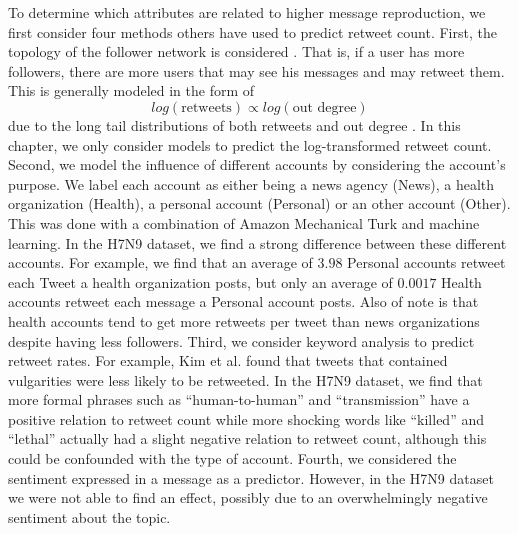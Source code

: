 To determine which attributes are related to higher message reproduction, we first consider four methods others have used to predict retweet count. First, the topology of the follower network is considered \cite{kwak2010twitter,Osborne2011rt}. That is, if a user has more followers, there are more users that may see his messages and may retweet them. This is generally modeled in the form of
\begin{equation}
log(\textrm{retweets}) \propto log(\textrm{out degree})
\end{equation}
due to the long tail distributions of both retweets and out degree \cite{kwak2010twitter}. In this chapter, we only consider models to predict the log-transformed retweet count. Second, we model the influence of different accounts by considering the account's purpose. We label each account as either being a news agency (News), a health organization (Health), a personal account (Personal) or an other account (Other). This was done with a combination of Amazon Mechanical Turk and machine learning. In the H7N9 dataset, we find a strong difference between these different accounts. For example, we find that an average of \(3.98\) Personal accounts retweet each Tweet a health organization posts, but only an average of \(0.0017\) Health accounts retweet each message a Personal account posts. Also of note is that health accounts tend to get more retweets per tweet than news organizations despite having less followers. Third, we consider keyword analysis to predict retweet rates. \cite{gransee2012,Kim2012retweet} For example, Kim et al. \cite{Kim2012retweet} found that tweets that contained vulgarities were less likely to be retweeted. In the H7N9 dataset, we find that more formal phrases such as ``human-to-human'' and ``transmission'' have a positive relation to retweet count while more shocking words like ``killed'' and ``lethal'' actually had a slight negative relation to retweet count, although this could be confounded with the type of account. Fourth, we considered the sentiment expressed in a message as a predictor. \cite{fan2013anger,Kim2012retweet} However, in the H7N9 dataset we were not able to find an effect, possibly due to an overwhelmingly negative sentiment about the topic.

